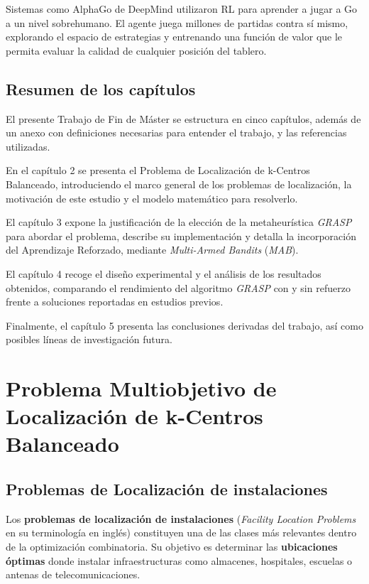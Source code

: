\documentclass[12pt,a4paper]{book}
\begin{document}
Sistemas como AlphaGo \citep{AlphaGo} de DeepMind utilizaron RL para aprender a jugar a Go a un nivel sobrehumano.
El agente juega millones de partidas contra sí mismo, explorando el espacio de estrategias y entrenando una función de valor que le permita evaluar la calidad de cualquier posición del tablero.


\section{Resumen de los capítulos}
El presente Trabajo de Fin de Máster se estructura en cinco capítulos, además de un anexo con definiciones necesarias para entender el trabajo, y las referencias utilizadas.

En el capítulo 2 se presenta el Problema de Localización de k-Centros Balanceado, introduciendo el marco general de los problemas de localización, la motivación de este estudio y el modelo matemático para resolverlo.

El capítulo 3 expone la justificación de la elección de la metaheurística \textit{GRASP} para abordar el problema, describe su implementación y detalla la incorporación del Aprendizaje Reforzado, mediante \textit{Multi-Armed Bandits} (\textit{MAB}).

El capítulo 4 recoge el diseño experimental y el análisis de los resultados obtenidos, comparando el rendimiento del algoritmo \textit{GRASP} con y sin refuerzo frente a soluciones reportadas en estudios previos.

Finalmente, el capítulo 5 presenta las conclusiones derivadas del trabajo, así como posibles líneas de investigación futura.

\chapter{Problema Multiobjetivo de Localización de k-Centros Balanceado}

\section{Problemas de Localización de instalaciones}

Los \textbf{problemas de localización de instalaciones} (\textit{Facility Location Problems} en su terminología en inglés) constituyen una de las clases más relevantes dentro de la optimización combinatoria. Su objetivo es determinar las \textbf{ubicaciones óptimas} donde instalar infraestructuras como almacenes, hospitales, escuelas o antenas de telecomunicaciones.
\end{document}
